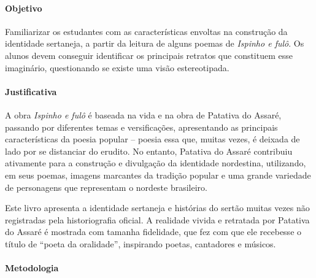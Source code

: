 \documentclass[12pt]{extarticle}
\begin{document}
\paragraph{Objetivo} Familiarizar os estudantes com as características envoltas na construção da 
identidade sertaneja, a partir da leitura de alguns poemas de \emph{Ispinho e fulô}.
Os alunos devem conseguir identificar os principais retratos que constituem esse imaginário, 
questionando se existe uma visão estereotipada. 

\paragraph{Justificativa} A obra \emph{Ispinho e fulô} é baseada na vida e na obra de
Patativa do Assaré, passando por diferentes temas e versificações,
apresentando as principais características da poesia popular -- poesia
essa que, muitas vezes, é deixada de lado por se distanciar do erudito.
No entanto, Patativa do Assaré contribuiu ativamente para a construção e
divulgação da identidade nordestina, utilizando, em seus poemas, imagens
marcantes da tradição popular e uma grande variedade de personagens que
representam o nordeste brasileiro.

Este livro apresenta a identidade sertaneja e histórias do sertão muitas
vezes não registradas pela historiografia oficial. A realidade vivida e
retratada por Patativa do Assaré é mostrada com tamanha fidelidade, que
fez com que ele recebesse o título de ``poeta da oralidade'', inspirando
poetas, cantadores e músicos.

\paragraph{Metodologia}
\end{document}

